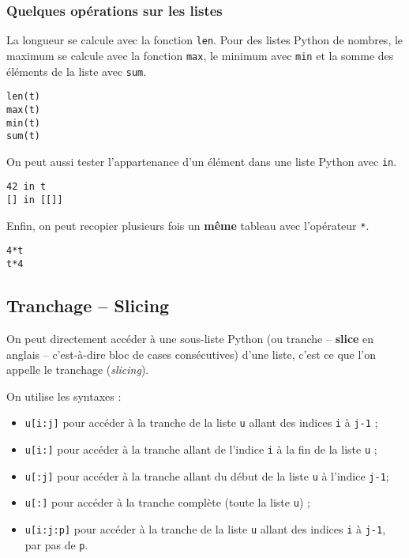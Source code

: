 
\subsubsection{Quelques opérations sur les listes}
La longueur se calcule avec la fonction \texttt{len}. Pour des listes Python de nombres, le maximum 
se calcule avec la fonction \texttt{max}, le minimum avec \texttt{min} et la somme des éléments de la 
liste avec \texttt{sum}.
\begin{lstlisting}
len(t)
max(t)
min(t)
sum(t)
\end{lstlisting}

On peut aussi tester l'appartenance d'un élément dans une liste Python avec \texttt{in}.

\begin{lstlisting}
42 in t
[] in [[]]
\end{lstlisting}

Enfin, on peut recopier plusieurs fois un \textbf{même} tableau avec l'opérateur \texttt{*}.

\begin{lstlisting}
4*t
t*4
\end{lstlisting}






%
\subsection{Tranchage -- Slicing}

On peut directement accéder à une sous-liste Python (ou tranche -- \textbf{slice} en anglais -- 
c'est-à-dire bloc de cases consécutives) d'une liste, c'est ce que l'on appelle le tranchage 
(\textit{slicing}).

On utilise les  syntaxes :
\begin{itemize}
  \item \texttt{u[i:j]} pour accéder à la tranche de la liste \texttt{u} allant des indices \texttt{i} à \texttt{j-1} ;
  \item \texttt{u[i:]} pour accéder à la tranche allant de l'indice \texttt{i} à la fin de la liste \texttt{u} ;
  \item \texttt{u[:j]} pour accéder à la tranche allant du début de la liste \texttt{u} à l'indice \texttt{j-1};
  \item \texttt{u[:]} pour accéder à la tranche complète (toute la liste \texttt{u}) ;
  \item \texttt{u[i:j:p]} pour accéder à la tranche de la liste \texttt{u} allant des indices \texttt{i} à \texttt{j-1}, par pas de \texttt{p}.
\end{itemize}

